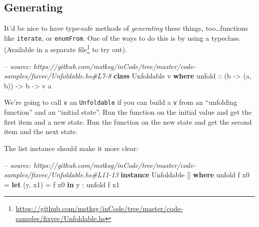\documentclass[]{article}
\newenvironment{Shaded}{}{}
\newcommand{\KeywordTok}[1]{\textcolor[rgb]{0.00,0.44,0.13}{\textbf{#1}}}
\newcommand{\DataTypeTok}[1]{\textcolor[rgb]{0.56,0.13,0.00}{#1}}
\newcommand{\DecValTok}[1]{\textcolor[rgb]{0.25,0.63,0.44}{#1}}
\newcommand{\CommentTok}[1]{\textcolor[rgb]{0.38,0.63,0.69}{\textit{#1}}}
\newcommand{\OtherTok}[1]{\textcolor[rgb]{0.00,0.44,0.13}{#1}}
\newcommand{\FunctionTok}[1]{\textcolor[rgb]{0.02,0.16,0.49}{#1}}
\newcommand{\NormalTok}[1]{#1}
\renewcommand{\href}[2]{#2\footnote{\url{#1}}}
\begin{document}
\subsection{Generating}\label{generating}

It'd be nice to have type-safe methods of \emph{generating} these things,
too\ldots{}functions like \texttt{iterate}, or \texttt{enumFrom}. One of the
ways to do this is by using a typeclass. (Available in a
\href{https://github.com/mstksg/inCode/tree/master/code-samples/fixvec/Unfoldable.hs}{separate
file} to try out).

\begin{Shaded}
\begin{Highlighting}[]
\CommentTok{-- source: https://github.com/mstksg/inCode/tree/master/code-samples/fixvec/Unfoldable.hs#L7-8}
\KeywordTok{class} \DataTypeTok{Unfoldable}\NormalTok{ v }\KeywordTok{where}
\OtherTok{    unfold ::}\NormalTok{ (b }\OtherTok{->}\NormalTok{ (a, b)) }\OtherTok{->}\NormalTok{ b }\OtherTok{->}\NormalTok{ v a}
\end{Highlighting}
\end{Shaded}

We're going to call \texttt{v} an \texttt{Unfoldable} if you can build a
\texttt{v} from an ``unfolding function'' and an ``initial state''. Run the
function on the initial value and get the first item and a new state. Run the
function on the new state and get the second item and the next state.

The list instance should make it more clear:

\begin{Shaded}
\begin{Highlighting}[]
\CommentTok{-- source: https://github.com/mstksg/inCode/tree/master/code-samples/fixvec/Unfoldable.hs#L11-13}
\KeywordTok{instance} \DataTypeTok{Unfoldable}\NormalTok{ [] }\KeywordTok{where}
\NormalTok{    unfold f x0 }\FunctionTok{=} \KeywordTok{let}\NormalTok{ (y, x1) }\FunctionTok{=}\NormalTok{ f x0}
                  \KeywordTok{in}\NormalTok{  y }\FunctionTok{:}\NormalTok{ unfold f x1}
\end{Highlighting}
\end{Shaded}

\begin{Shaded}
\end{Shaded}
\end{document}
